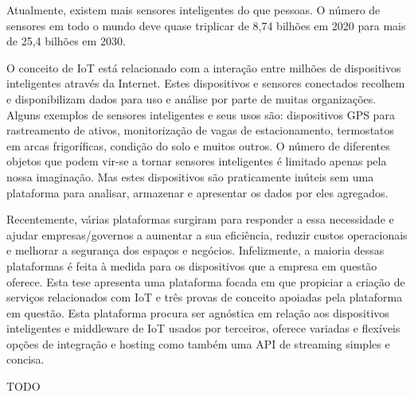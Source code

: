 \begin{abstractotherlanguage}

Atualmente, existem mais sensores inteligentes do que pessoas. O número de sensores em todo o mundo deve quase triplicar de 8,74 bilhões em 2020 para mais de 25,4 bilhões em 2030.

O conceito de \gls{IoT} está relacionado com a interação entre milhões de dispositivos inteligentes através da Internet. Estes dispositivos e sensores conectados recolhem e disponibilizam dados para uso e análise por parte de muitas organizações.
Alguns exemplos de sensores inteligentes e seus usos são: dispositivos GPS para rastreamento de ativos, monitorização de vagas de estacionamento, termostatos em arcas frigoríficas, condição do solo e muitos outros. O número de diferentes objetos que podem vir-se a tornar sensores inteligentes é limitado apenas pela nossa imaginação. Mas estes dispositivos são praticamente inúteis sem uma plataforma para analisar, armazenar e apresentar os dados por eles agregados.

Recentemente, várias plataformas surgiram para responder a essa necessidade e ajudar empresas/governos a aumentar a sua eficiência, reduzir custos operacionais e melhorar a segurança dos espaços e negócios. Infelizmente, a maioria dessas plataformas é feita à medida para os dispositivos que a empresa em questão oferece. Esta tese apresenta uma plataforma focada em que propiciar a criação de serviços relacionados com \gls{IoT} e três provas de conceito apoiadas pela plataforma em questão. Esta plataforma procura ser agnóstica em relação aos dispositivos inteligentes e middleware de \gls{IoT} usados por terceiros, oferece variadas e flexíveis opções de integração e hosting como também uma \gls{API} de streaming simples e concisa.

\end{abstractotherlanguage}


\begin{acknowledgements}

TODO

\end{acknowledgements}

